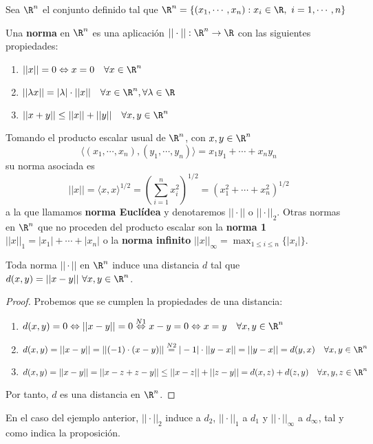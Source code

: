 Sea $\R^n$ el conjunto definido tal que $\R^n=\{(x_1,\cdots,x_n):x_i \in \R, \ i=1,\cdots,n\}$
\begin{ndef}[Norma]
  Una \textbf{norma} en $\R^n$ es una aplicación $||\cdot||: \R^n \to \R$ con las siguientes propiedades:
  \begin{enumerate}[label=N{{\arabic*}}]
    \item $||x||=0 \Leftrightarrow x=0 \quad \forall x \in \R^n$
    \item $||\lambda x||=|\lambda| \cdot ||x||\quad \forall x \in \R^n, \forall \lambda \in \R$
    \item $||x+y|| \le ||x||+||y|| \quad \forall x,y \in \R^n$
  \end{enumerate}
\end{ndef}
\begin{exmp}
  Tomando el producto escalar usual de $\R^n$, con $x,y \in \R^n$ \[\langle (x_1, \cdots, x_n), (y_1,\cdots,y_n)\rangle=x_1y_1+\cdots+x_ny_n\] su norma asociada es \[||x||=\langle x,x\rangle^{1/2}= \left(\sum^n_{i=1}x^2_i\right)^{1/2}=(x^2_1+\cdots+x^2_n)^{1/2}\]
  a la que llamamos \textbf{norma Euclídea} y denotaremos $||\cdot||$ o $||\cdot||_2$. Otras normas en $\R^n$ que no proceden del producto escalar son la \textbf{norma 1} $||x||_1=|x_1|+\cdots+|x_n|$ o la \textbf{norma infinito} $||x||_\infty = \max_{1 \leq i \leq n} \{|x_i|\}$.
\end{exmp}

\begin{nprop}
  Toda norma $||\cdot||$ en $\R^n$ induce una distancia $d$ tal que $d(x,y)=||x-y|| \ \forall x,y \in \R^n$.
\end{nprop}
\begin{proof} Probemos que se cumplen la propiedades de una distancia:
  \begin{enumerate}[label=D{{\arabic*}}]
    \item $d(x,y)=0 \Leftrightarrow ||x-y||=0 \stackrel{N1}{\Leftrightarrow} x-y=0 \Leftrightarrow x=y \quad \forall x,y \in \R^n$
    \item $d(x,y)=||x-y||=||(-1)\cdot(x-y)||\stackrel{N2}{=} |-1|\cdot||y-x||=||y-x||=d(y,x) \quad \forall x,y \in \R^n$
    \item $d(x,y)=||x-y||=||x-z+z-y|| \le ||x-z||+||z-y||=d(x,z)+d(z,y) \quad \forall x,y,z \in \R^n$
  \end{enumerate}
  Por tanto, $d$ es una distancia en $\R^n$.
\end{proof}
\begin{exmp}
  En el caso del ejemplo anterior, $||\cdot||_2$ induce a $d_2$, $||\cdot||_1$ a $d_1$ y $||\cdot||_\infty$ a $d_\infty$, tal y como indica la proposición.
\end{exmp}

